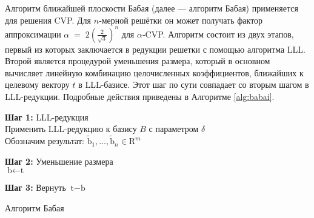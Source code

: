 Алгоритм ближайшей плоскости Бабая \cite{cite_32} (далее — алгоритм Бабая)
применяется для решения CVP. Для $n$‑мерной решётки он может получать фактор
аппроксимации $\alpha \;=\; 2\!\left(\frac{2}{\sqrt{3}}\right)^{n}$ для
$\alpha$‑CVP. Алгоритм состоит из двух этапов, первый из которых заключается в
редукции решетки с помощью алгоритма LLL. Второй является процедурой уменьшения
размера, который в основном вычисляет линейную комбинацию целочисленных
коэффициентов, ближайших к целевому вектору $t$ в LLL-базисе. Этот шаг по сути
совпадает со вторым шагом в LLL-редукции. Подробные действия приведены в
Алгоритме \ref{alg:babai}.

\begin{algorithm}[htp!]
    \SetAlgoLined


    \textbf{Шаг 1:} LLL-редукция \\
    Применить LLL-редукцию к базису $B$ с параметром $\delta$ \\
    Обозначим результат: $\tilde{\text{b}}_1, \dots, \tilde{\text{b}}_n \in \text{R}^m$

    \textbf{Шаг 2:} Уменьшение размера \\
    $\text{b} \gets \text{t}$


    \textbf{Шаг 3:} Вернуть $\text{t} - \text{b}$

    \caption{Алгоритм Бабая}
    \label{alg:babai}
\end{algorithm}
